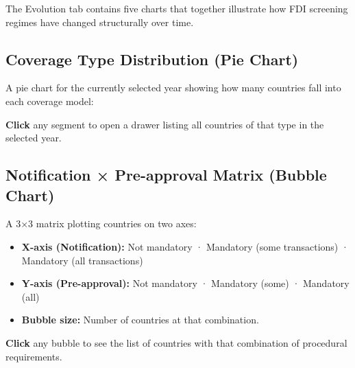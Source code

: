 \documentclass[12pt,a4paper]{article}
\newcommand{\badge}[2]{%
  \colorbox{#1}{\color{white}\footnotesize\textbf{\strut\,#2\,}}%
}
\begin{document}
The Evolution tab contains five charts that together illustrate how FDI screening regimes have changed structurally over time.

\subsection{Coverage Type Distribution (Pie Chart)}

A pie chart for the currently selected year showing how many countries fall into each coverage model:


\textbf{Click} any segment to open a drawer listing all countries of that type in the selected year.

\subsection{Notification × Pre-approval Matrix (Bubble Chart)}

A 3×3 matrix plotting countries on two axes:

\begin{itemize}
  \item \textbf{X-axis (Notification):} Not mandatory · Mandatory (some transactions) · Mandatory (all transactions)
  \item \textbf{Y-axis (Pre-approval):} Not mandatory · Mandatory (some) · Mandatory (all)
  \item \textbf{Bubble size:} Number of countries at that combination.
\end{itemize}

\textbf{Click} any bubble to see the list of countries with that combination of procedural requirements.
\end{document}
